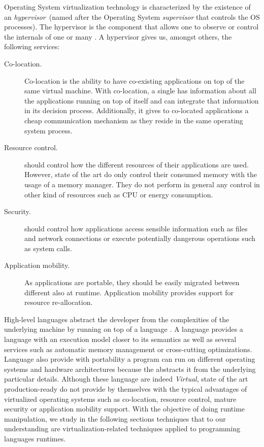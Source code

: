 Operating System virtualization technology is characterized by the existence of an \emph{hypervisor}~(named after the Operating System \emph{supervisor} that controls the OS processes). The hypervisor is the \VM component that allows one to observe or control the internals of one or many \VMs. A \VM hypervisor gives us, amongst others, the following services:

\begin{description}
\item[Co-location.] Co-location is the ability to have co-existing applications on top of the same virtual machine. With co-location, a single \VM has information about all the applications running on top of itself and can integrate that information in its decision process. Additionally, it gives to co-located applications a cheap communication mechanism as they reside in the same operating system process.
\item[Resource control.] \VMs should control how the different resources of their applications are used. However, state of the art \VMs do only control their consumed memory with the usage of a memory manager. They do not perform in general any control in other kind of resources such as CPU or energy consumption.
\item[Security.] \VMs should control how applications access sensible information such as files and network connections or execute potentially dangerous operations such as system calls.
\item[Application mobility.] As applications are portable, they should be easily migrated between different \VMs also at runtime. Application mobility provides support for resource re-allocation.
\end{description}

High-level languages abstract the developer from the complexities of the underlying machine by running on top of a language \VM. A language \VM provides a language with an execution model closer to its semantics as well as several services such as automatic memory management or cross-cutting optimizations. Language \VMs also provide with portability \ie a program can run on different operating systems and hardware architectures because the \VM abstracts it from the underlying particular details. Although these language \VMs are indeed \emph{Virtual}, state of the art production-ready \VMs do not provide by themselves with the typical advantages of virtualized operating systems such as co-location, resource control, mature security or application mobility support.
With the objective of doing runtime manipulation, we study in the following sections techniques that to our understanding are virtualization-related techniques applied to programming languages runtimes.%


